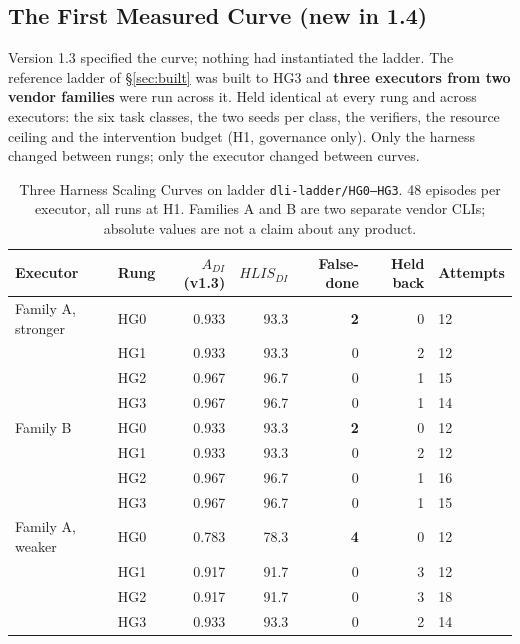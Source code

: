 \documentclass[11pt]{article}
\theoremstyle{definition}
\begin{document}
\subsection{The First Measured Curve (new in 1.4)}\label{sec:measured}

Version 1.3 specified the curve; nothing had instantiated the ladder. The reference ladder of \S\ref{sec:built} was built to HG3 and \textbf{three executors from two vendor families} were run across it. Held identical at every rung and across executors: the six task classes, the two seeds per class, the verifiers, the resource ceiling and the intervention budget (H1, governance only). Only the harness changed between rungs; only the executor changed between curves.

\begin{table}[h]
\centering\small
\begin{tabularx}{\textwidth}{@{}p{}lrrrrY@{}}
\toprule
Executor & Rung & $A_{DI}$ (v1.3) & $HLIS_{DI}$ & False-done & Held back & Attempts \\
\midrule
Family A, stronger & HG0 & 0.933 & 93.3 & \textbf{2} & 0 & 12 \\
                   & HG1 & 0.933 & 93.3 & 0 & 2 & 12 \\
                   & HG2 & 0.967 & 96.7 & 0 & 1 & 15 \\
                   & HG3 & 0.967 & 96.7 & 0 & 1 & 14 \\
\midrule
Family B & HG0 & 0.933 & 93.3 & \textbf{2} & 0 & 12 \\
         & HG1 & 0.933 & 93.3 & 0 & 2 & 12 \\
         & HG2 & 0.967 & 96.7 & 0 & 1 & 16 \\
         & HG3 & 0.967 & 96.7 & 0 & 1 & 15 \\
\midrule
Family A, weaker & HG0 & 0.783 & 78.3 & \textbf{4} & 0 & 12 \\
                 & HG1 & 0.917 & 91.7 & 0 & 3 & 12 \\
                 & HG2 & 0.917 & 91.7 & 0 & 3 & 18 \\
                 & HG3 & 0.933 & 93.3 & 0 & 2 & 14 \\
\bottomrule
\end{tabularx}
\caption{Three Harness Scaling Curves on ladder \texttt{dli-ladder/HG0--HG3}. 48 episodes per executor, all runs at H1. Families A and B are two separate vendor CLIs; absolute values are not a claim about any product.}
\end{table}
\end{document}
